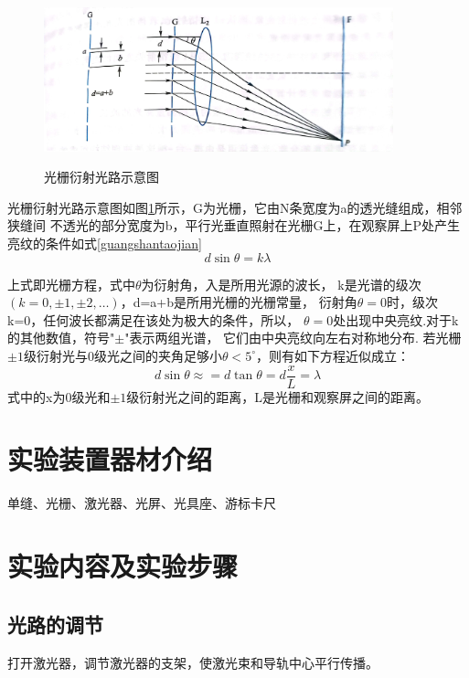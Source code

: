 \documentclass{ctexart}
\begin{document}
  \begin{figure}[H]
    \centering\label{gsguanglu}
    \includegraphics[width=0.9\textwidth,height=0.2\textheight]{gsguanglu.jpg}
    \caption{光栅衍射光路示意图}
  \end{figure}

  光栅衍射光路示意图如图\ref{gsguanglu}所示，G为光栅，它由N条宽度为a的透光缝组成，相邻狭缝间
  不透光的部分宽度为b，平行光垂直照射在光栅G上，在观察屏上P处产生亮纹的条件如式\ref{guangshantaojian}
  \begin{equation}\label{guangshantaojian}
    d\sin \theta = k\lambda
  \end{equation}

  上式即光栅方程，式中$\theta$为衍射角，入是所用光源的波长，
  k是光谱的级次$(k=0,\pm 1,\pm 2,…)$，d=a+b是所用光栅的光栅常量，
  衍射角$\theta=0$时，级次k=0，任何波长都满足在该处为极大的条件，所以，
  $\theta=0$处出现中央亮纹.对于k的其他数值，符号"$\pm$"表示两组光谱，
  它们由中央亮纹向左右对称地分布.
  若光栅$\pm 1$级衍射光与0级光之间的夹角足够小$\theta<5^{\circ}$，则有如下方程近似成立：
  \begin{equation}
    d\sin\theta\approx=d\tan\theta=d\frac{x}{L}=\lambda
  \end{equation}
  式中的x为0级光和$\pm 1$级衍射光之间的距离，L是光栅和观察屏之间的距离。

\section{实验装置器材介绍}
单缝、光栅、激光器、光屏、光具座、游标卡尺

\section{实验内容及实验步骤}
  \subsection{光路的调节}
   打开激光器，调节激光器的支架，使激光束和导轨中心平行传播。
\end{document}
